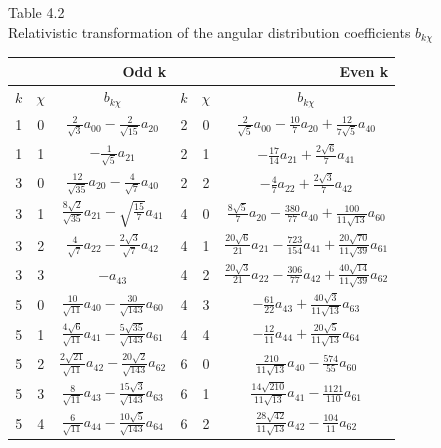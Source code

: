 \documentclass[10pt]{article}
\begin{document}
Table 4.2\\
Relativistic transformation of the angular distribution coefficients $b_{k \chi}$

\begin{center}
\begin{tabular}{|c|c|c|c|c|c|}
\hline
\multicolumn{3}{|r|}{Odd k} & \multicolumn{3}{|r|}{Even k} \\
\hline
$k$ & $\chi$ & $b_{k \chi}$ & $k$ & $\chi$ & $b_{k \chi}$ \\
\hline
1 & 0 & $\frac{2}{\sqrt{3}} a_{00}-\frac{2}{\sqrt{15}} a_{20}$ & 2 & 0 & $\frac{2}{\sqrt{5}} a_{00}-\frac{10}{7} a_{20}+\frac{12}{7 \sqrt{5}} a_{40}$ \\
\hline
1 & 1 & $-\frac{1}{\sqrt{5}} a_{21}$ & 2 & 1 & $-\frac{17}{14} a_{21}+\frac{2 \sqrt{6}}{7} a_{41}$ \\
\hline
3 & 0 & \( \frac{12}{\sqrt{35}} a_{20}-\frac{4}{\sqrt{7}} a_{40} \) & 2 & 2 & $-\frac{4}{7} a_{22}+\frac{2 \sqrt{3}}{7} a_{42}$ \\
\hline
3 & 1 & \( \frac{8 \sqrt{2}}{\sqrt{35}} a_{21}-\sqrt{\frac{15}{7}} a_{41} \) & 4 & 0 & \( \frac{8 \sqrt{5}}{7} a_{20}-\frac{380}{77} a_{40}+\frac{100}{11 \sqrt{13}} a_{60} \) \\
\hline
3 & 2 & $\frac{4}{\sqrt{7}} a_{22}-\frac{2 \sqrt{3}}{\sqrt{7}} a_{42}$ & 4 & 1 & \( \frac{20 \sqrt{6}}{21} a_{21}-\frac{723}{154} a_{41}+\frac{20 \sqrt{70}}{11 \sqrt{39}} a_{61} \) \\
\hline
3 & 3 & $-a_{43}$ & 4 & 2 & \( \frac{20 \sqrt{3}}{21} a_{22}-\frac{306}{77} a_{42}+\frac{40 \sqrt{14}}{11 \sqrt{39}} a_{62} \) \\
\hline
5 & 0 & $\frac{10}{\sqrt{11}} a_{40}-\frac{30}{\sqrt{143}} a_{60}$ & 4 & 3 & \( -\frac{61}{22} a_{43}+\frac{40 \sqrt{3}}{11 \sqrt{13}} a_{63} \) \\
\hline
5 & 1 & $\frac{4 \sqrt{6}}{\sqrt{11}} a_{41}-\frac{5 \sqrt{35}}{\sqrt{143}} a_{61}$ & 4 & 4 & \( -\frac{12}{11} a_{44}+\frac{20 \sqrt{5}}{11 \sqrt{13}} a_{64} \) \\
\hline
5 & 2 & \( \frac{2 \sqrt{21}}{\sqrt{11}} a_{42}-\frac{20 \sqrt{2}}{\sqrt{143}} a_{62} \) & 6 & 0 & $\frac{210}{11 \sqrt{13}} a_{40}-\frac{574}{55} a_{60}$ \\
\hline
5 & 3 & $\frac{8}{\sqrt{11}} a_{43}-\frac{15 \sqrt{3}}{\sqrt{143}} a_{63}$ & 6 & 1 & \( \frac{14 \sqrt{210}}{11 \sqrt{13}} a_{41}-\frac{1121}{110} a_{61} \) \\
\hline
5 & 4 & \( \frac{6}{\sqrt{11}} a_{44}-\frac{10 \sqrt{5}}{\sqrt{143}} a_{64} \) & 6 & 2 & \( \frac{28 \sqrt{42}}{11 \sqrt{13}} a_{42}-\frac{104}{11} a_{62} \) \\

\end{tabular}
\end{center}
\end{document}
